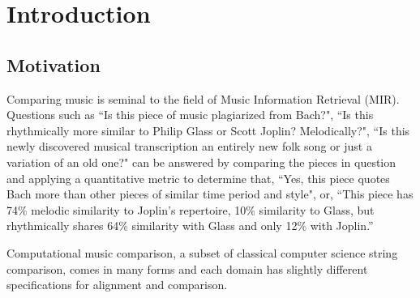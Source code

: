 \chapter{Introduction}

\section{Motivation}


Comparing music is seminal to the field of Music Information Retrieval (MIR). Questions such as ``Is this piece of music plagiarized from Bach?", ``Is this rhythmically more similar to Philip Glass or Scott Joplin? Melodically?", ``Is this newly discovered musical transcription an entirely new folk song or just a variation of an old one?" can be answered by comparing the pieces in question and applying a quantitative metric to determine that, ``Yes, this piece quotes Bach more than other pieces of similar time period and style", or, ``This piece has 74\% melodic similarity to Joplin's repertoire, 10\% similarity to Glass, but rhythmically shares 64\% similarity with Glass and only 12\% with Joplin.''

Computational music comparison, a subset of classical computer science string comparison, comes in many forms and each domain has slightly different specifications for alignment and comparison. 

